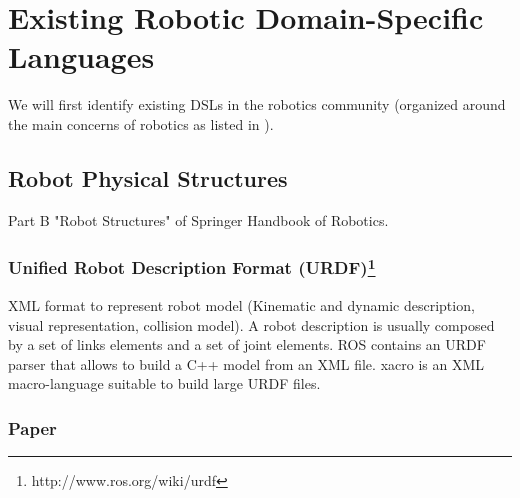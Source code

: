 \documentclass[book]{apa}
\begin{document}
\section{Existing Robotic Domain-Specific Languages}
We will first identify existing DSLs in the robotics community (organized around the main concerns of robotics as listed in \cite{SpringerHandbook:2008fk}).
\subsection{Robot Physical Structures}
Part B "Robot Structures" of Springer Handbook of Robotics.

\subsubsection{Unified Robot Description Format (URDF)\footnote{http://www.ros.org/wiki/urdf}}
XML format to represent robot model (Kinematic and dynamic description, visual representation, collision model).
A robot description is usually composed by a set of links elements and a set of joint elements.
ROS contains an URDF parser that allows to build a C++ model from an XML file.
xacro is an XML macro-language suitable to build large URDF files.

\subsubsection{Paper\cite{Brugali:ec}}


\end{document}
